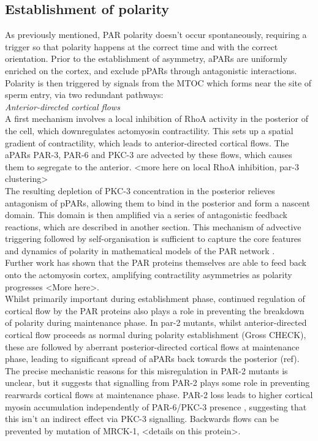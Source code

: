 \documentclass[12pt]{"report"}
\begin{document}
\subsection{Establishment of polarity}

As previously mentioned, PAR polarity doesn't occur spontaneously, requiring a trigger so that polarity happens at the correct time and with the correct orientation. Prior to the establishment of asymmetry, aPARs are uniformly enriched on the cortex, and exclude pPARs through antagonistic interactions. Polarity is then triggered by signals from the MTOC which forms near the site of sperm entry, via two redundant pathways:\\

\textit{Anterior-directed cortical flows}\\

A first mechanism involves a local inhibition of RhoA activity in the posterior of the cell, which downregulates actomyosin contractility. This sets up a spatial gradient of contractility, which leads to anterior-directed cortical flows. The aPARs PAR-3, PAR-6 and PKC-3 are advected by these flows, which causes them to segregate to the anterior. <more here on local RhoA inhibition, par-3 clustering>\\

The resulting depletion of PKC-3 concentration in the posterior relieves antagonism of pPARs, allowing them to bind in the posterior and form a nascent domain. This domain is then amplified via a series of antagonistic feedback reactions, which are described in another section. This mechanism of advective triggering followed by self-organisation is sufficient to capture the core features and dynamics of polarity in mathematical models of the PAR network \citep{Goehring2011a}.\\

Further work has shown that the PAR proteins themselves are able to feed back onto the actomyosin cortex, amplifying contractility asymmetries as polarity progresses \citep{Gross2018} <More here>.\\

Whilst primarily important during establishment phase, continued regulation of cortical flow by the PAR proteins also plays a role in preventing the breakdown of polarity during maintenance phase. In par-2 mutants, whilst anterior-directed cortical flow proceeds as normal during polarity establishment (Gross CHECK), these are followed by aberrant posterior-directed cortical flows at maintenance phase, leading to significant spread of aPARs back towards the posterior (ref). The precise mechanistic reasons for this misregulation in PAR-2 mutants is unclear, but it suggests that signalling from PAR-2 plays some role in preventing rearwards cortical flows at maintenance phase.  PAR-2 loss leads to higher cortical myosin accumulation independently of PAR-6/PKC-3 presence \citep{Munro2004, Beatty2013}, suggesting that this isn't an indirect effect via PKC-3 signalling. Backwards flows can be prevented by mutation of MRCK-1, <details on this protein>.\\
\end{document}
